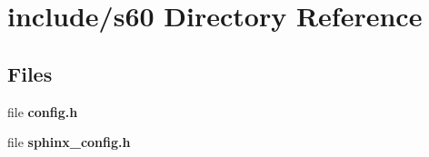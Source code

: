 \section{include/s60 Directory Reference}
\label{dir_c9f92350fe7fa900a58d7f43cbde6c10}
\subsection*{Files}
\begin{DoxyCompactItemize}
\item 
file {\bfseries config.\-h}
\item 
file {\bfseries sphinx\-\_\-config.\-h}
\end{DoxyCompactItemize}

